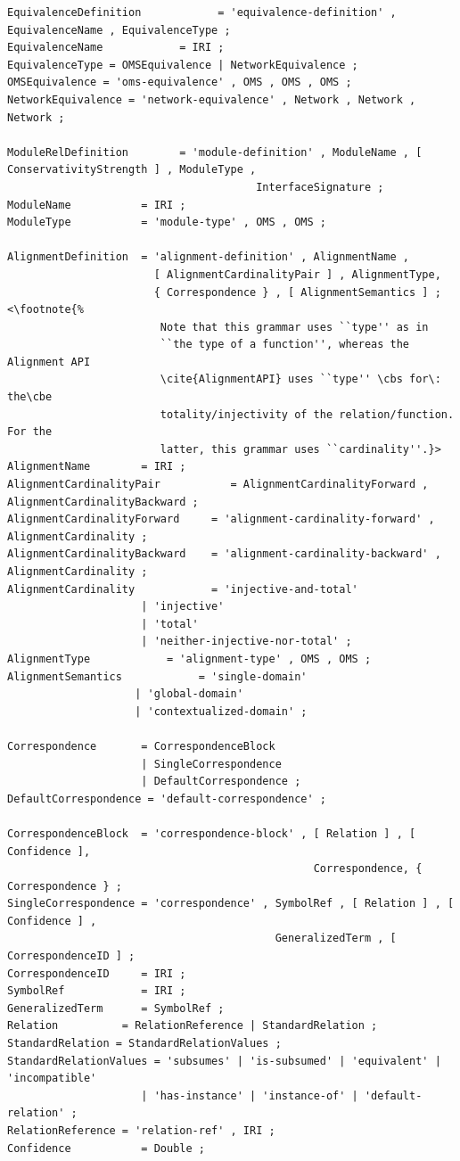 \documentclass[10pt,fleqn,final]{scrreprt}
\newcommand{\cbs}[0]{\color{red}\xspace} %
\newcommand{\cbe}[0]{\color{black}\xspace} %
\newenvironment{definitions}[0]{\medskip }{}
\begin{document}
\begin{definitions}
\begin{lstlisting}[language=ebnf,escapeinside={<>},mathescape]
EquivalenceDefinition            = 'equivalence-definition' , EquivalenceName , EquivalenceType ;
EquivalenceName            = IRI ;
EquivalenceType = OMSEquivalence | NetworkEquivalence ;
OMSEquivalence = 'oms-equivalence' , OMS , OMS , OMS ;
NetworkEquivalence = 'network-equivalence' , Network , Network , Network ;

ModuleRelDefinition        = 'module-definition' , ModuleName , [ ConservativityStrength ] , ModuleType ,
                                       InterfaceSignature ;
ModuleName           = IRI ;
ModuleType           = 'module-type' , OMS , OMS ;

AlignmentDefinition  = 'alignment-definition' , AlignmentName ,
                       [ AlignmentCardinalityPair ] , AlignmentType,
                       { Correspondence } , [ AlignmentSemantics ] ; <\footnote{%
                        Note that this grammar uses ``type'' as in
                        ``the type of a function'', whereas the Alignment API
                        \cite{AlignmentAPI} uses ``type'' \cbs for\:  the\cbe
                        totality/injectivity of the relation/function.  For the
                        latter, this grammar uses ``cardinality''.}>
AlignmentName        = IRI ;
AlignmentCardinalityPair           = AlignmentCardinalityForward , AlignmentCardinalityBackward ; 
AlignmentCardinalityForward     = 'alignment-cardinality-forward' , AlignmentCardinality ;
AlignmentCardinalityBackward    = 'alignment-cardinality-backward' , AlignmentCardinality ;
AlignmentCardinality            = 'injective-and-total'
                     | 'injective'
                     | 'total'
                     | 'neither-injective-nor-total' ;
AlignmentType            = 'alignment-type' , OMS , OMS ;
AlignmentSemantics            = 'single-domain' 
                    | 'global-domain' 
                    | 'contextualized-domain' ; 

Correspondence       = CorrespondenceBlock
                     | SingleCorrespondence
                     | DefaultCorrespondence ;
DefaultCorrespondence = 'default-correspondence' ;

CorrespondenceBlock  = 'correspondence-block' , [ Relation ] , [ Confidence ],
                                                Correspondence, { Correspondence } ; 
SingleCorrespondence = 'correspondence' , SymbolRef , [ Relation ] , [ Confidence ] ,
                                          GeneralizedTerm , [ CorrespondenceID ] ;
CorrespondenceID     = IRI ;
SymbolRef            = IRI ;
GeneralizedTerm      = SymbolRef ;
Relation          = RelationReference | StandardRelation ;
StandardRelation = StandardRelationValues ;
StandardRelationValues = 'subsumes' | 'is-subsumed' | 'equivalent' | 'incompatible' 
                     | 'has-instance' | 'instance-of' | 'default-relation' ; 
RelationReference = 'relation-ref' , IRI ;
Confidence           = Double ;
\end{lstlisting}
\begin{lstlisting}[language=ebnf,escapeinside={()},mathescape]  % abstract syntax


\end{lstlisting}
\end{definitions}
\end{document}
